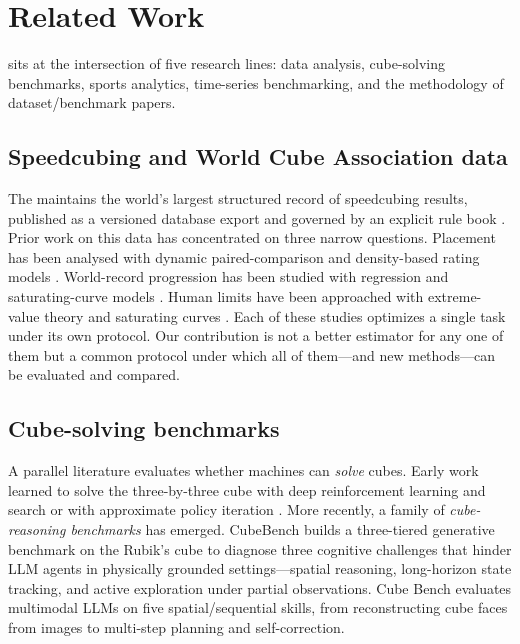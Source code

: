 \section{Related Work}
\label{sec:related}

\wcabench{} sits at the intersection of five research lines: \wca{} data
analysis, cube-solving benchmarks, sports analytics, time-series benchmarking,
and the methodology of dataset/benchmark papers.

\subsection{Speedcubing and World Cube Association data}
\label{sec:related-wca}

The \wca{} maintains the world's largest structured record of speedcubing
results, published as a versioned database export and governed by an explicit
rule book \citep{wca_export, wca_regs}. Prior work on this data has
concentrated on three narrow questions. Placement has been analysed with
dynamic paired-comparison and density-based rating models
\citep{glickman_rating}. World-record progression has been studied with
regression and saturating-curve models \citep{tatem_sprint, nevill_running}.
Human limits have been approached with extreme-value theory and saturating
curves \citep{evt_coles, nevill_running}. Each of these studies optimizes a
single task under its own protocol. Our contribution is not a better estimator
for any one of them but a common protocol under which all of them---and new
methods---can be evaluated and compared.

\subsection{Cube-solving benchmarks}
\label{sec:related-cubebench}

A parallel literature evaluates whether machines can \emph{solve} cubes. Early
work learned to solve the three-by-three cube with deep reinforcement learning
and search \citep{deepcubea} or with approximate policy iteration
\citep{mcaleer_cube}. More recently, a family of \emph{cube-reasoning
benchmarks} has emerged. CubeBench \citep{cubebench} builds a three-tiered
generative benchmark on the Rubik's cube to diagnose three cognitive challenges
that hinder LLM agents in physically grounded settings---spatial reasoning,
long-horizon state tracking, and active exploration under partial observations.
Cube Bench \citep{cube_bench_mllm} evaluates multimodal LLMs on five
spatial/sequential skills, from reconstructing cube faces from images to
multi-step planning and self-correction.

